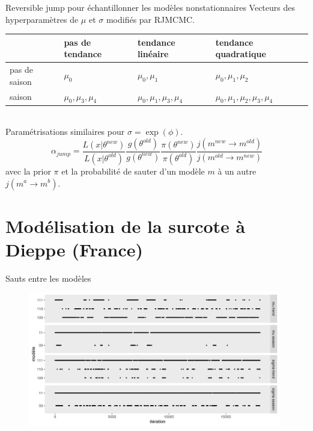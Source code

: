 \documentclass[aspectratio=169]{beamer}
\begin{document}
\begin{frame}{Reversible jump pour échantillonner les modèles nonstationnaires}
Vecteurs des hyperparamètres de $\mu$ et $\sigma$ modifiés par RJMCMC.
\vspace{0.3cm} \\
\begin{centering}
\begin{tabular}{ l|lll }
  & pas de tendance & tendance linéaire & tendance quadratique \\
 \hline
 pas de saison & $\mu_0$ & $\mu_0, \mu_1$ & $\mu_0, \mu_1, \mu_2$ \\ 
 saison & $\mu_0, \mu_3, \mu_4$ & $\mu_0, \mu_1, \mu_3, \mu_4$ & $\mu_0, \mu_1, \mu_2, \mu_3, \mu_4$ \\
 \hline
\end{tabular}
\end{centering}
\vspace{0.2cm} \\
Paramétrisations similaires pour $\sigma = \exp(\phi)$.
\begin{equation*}
\alpha_{jump} =
\dfrac{L(x|\theta^{new})}{L(x|\theta^{old})}
\dfrac{g(\theta^{old})}{g(\theta^{new})}
\dfrac{\pi(\theta^{new})}{\pi(\theta^{old})}
\dfrac{j(m^{new} \rightarrow m^{old})}{j(m^{old} \rightarrow m^{new})}
\end{equation*}
avec la prior $\pi$ et la probabilité de sauter d'un modèle $m$ à un autre $j(m^a \rightarrow m^b)$.
	\vspace{0.3cm} \\
	{\scriptsize
	}
\end{frame}



\section{Modélisation de la surcote à Dieppe (France)}


\begin{frame}{Sauts entre les modèles}
	\begin{figure}
	\vspace{-0.25cm}
	 \includegraphics[width=0.98\textwidth, center]{../figures/jumps.png}
	\end{figure}
\end{frame}
\end{document}
